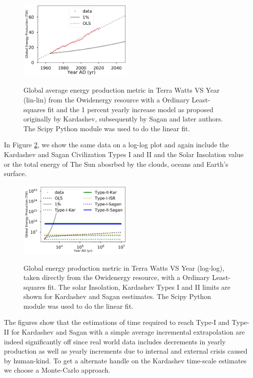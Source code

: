 \documentclass[final,5p,times,twocolumn,authoryear]{elsarticle}
\begin{document}
\begin{figure}
    \centering
    \includegraphics[width=0.5\textwidth]{figs/fig1_kard.jpg}
    \label{fig:kardashev1}
    \caption{Global average energy production metric in Terra Watts VS Year (lin-lin) from the Owidenergy resource with a Ordinary Least-squares fit and the 1 percent yearly increase model as proposed originally by Kardashev, subsequently by Sagan and later authors. The Scipy Python module was used to do the linear fit.}
\end{figure}

In Figure \ref{fig:kardashev3}, we show the same data on a log-log plot and again include the Kardashev and Sagan Civilization Types I and II and the Solar Insolation value or the total energy of The Sun abosrbed by the clouds, oceans and Earth's surface. %


\begin{figure}
    \centering
    \includegraphics[width=0.5\textwidth]{figs/fig2_kar.jpg}
    \label{fig:kardashev3}
    \caption{Global energy production metric in Terra Watts VS Year (log-log), taken directly from the Owidenergy resource, with a Ordinary Least-squares fit. The solar Insolation, Kardashev Types I and II limits are shown for Kardashev and Sagan esstimates. The Scipy Python module was used to do the linear fit.}
\end{figure}

The figures show that the estimations of time required to reach Type-I and Type-II for Kardashev and Sagan with a simple average incremental extrapolation are indeed significantly off since real world data includes decrements in yearly production as well as yearly increments due to internal and external crisis caused by human-kind. To get a alternate handle on the Kardashev time-scale estimates we choose a Monte-Carlo approach.
\end{document}
